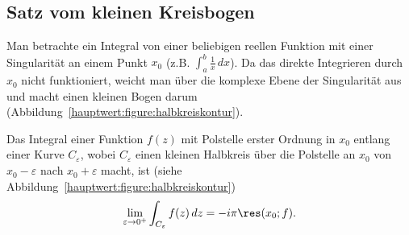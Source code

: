 \subsection{Satz vom kleinen Kreisbogen
\label{hauptwert:subsection:halbresiduen}}

Man betrachte ein Integral von einer beliebigen reellen Funktion mit einer
Singularität an einem Punkt $x_0$ (z.B. $\int_{a}^{b} \frac{1}{x}\,dx$). Da das
direkte Integrieren durch $x_0$ nicht funktioniert, weicht man über die
komplexe Ebene der Singularität aus und macht einen kleinen Bogen darum
(Abbildung~\ref{hauptwert:figure:halbkreiskontur}).
\begin{lemma}
\label{hauptwert:lemma:halbresiduen}
Das Integral einer Funktion $f(z)$ mit Polstelle erster Ordnung in $x_0$
entlang einer Kurve $C_\varepsilon$, wobei $C_\varepsilon$ einen kleinen
Halbkreis über die Polstelle an $x_0$ von $x_0-\varepsilon$ nach
$x_0+\varepsilon$ macht, ist
(siehe Abbildung~\ref{hauptwert:figure:halbkreiskontur})
\begin{equation}
  \lim_{\varepsilon \to 0^+} \int_{C_\varepsilon} f(z)\,dz = -i\pi \res(x_0;f).
\end{equation}
\end{lemma}

